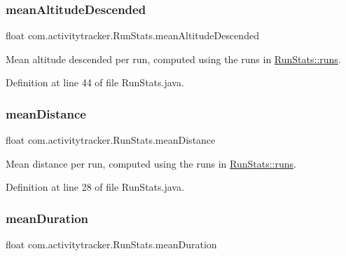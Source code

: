 \subsubsection{\texorpdfstring{mean\+Altitude\+Descended}{meanAltitudeDescended}}
{\footnotesize\ttfamily float com.\+activitytracker.\+Run\+Stats.\+mean\+Altitude\+Descended\hspace{0.3cm}{\ttfamily [private]}}

Mean altitude descended per run, computed using the runs in \mbox{\hyperlink{classcom_1_1activitytracker_1_1_run_stats_a0fd429e9f463ddf4897c507c0e3c0a12}{Run\+Stats\+::runs}}. 

Definition at line 44 of file Run\+Stats.\+java.

\mbox{\label{classcom_1_1activitytracker_1_1_run_stats_afcc9ab47852b6df6b15e9a592fe6c5ed}} 
\subsubsection{\texorpdfstring{mean\+Distance}{meanDistance}}
{\footnotesize\ttfamily float com.\+activitytracker.\+Run\+Stats.\+mean\+Distance\hspace{0.3cm}{\ttfamily [private]}}

Mean distance per run, computed using the runs in \mbox{\hyperlink{classcom_1_1activitytracker_1_1_run_stats_a0fd429e9f463ddf4897c507c0e3c0a12}{Run\+Stats\+::runs}}. 

Definition at line 28 of file Run\+Stats.\+java.

\mbox{\label{classcom_1_1activitytracker_1_1_run_stats_a8bf9f1577cffd26e6235695278bfcdb9}} 
\subsubsection{\texorpdfstring{mean\+Duration}{meanDuration}}
{\footnotesize\ttfamily float com.\+activitytracker.\+Run\+Stats.\+mean\+Duration\hspace{0.3cm}{\ttfamily [private]}}


